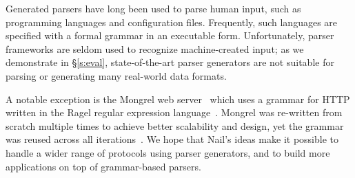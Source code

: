 Generated parsers have long been used to parse human input, such
as programming languages and configuration files. Frequently, such
languages are specified with a formal grammar in an executable
form. Unfortunately, parser frameworks are seldom used to recognize
machine-created input; as we demonstrate in \S\ref{s:eval},
state-of-the-art parser generators are not suitable for parsing or
generating many real-world data formats.

A notable exception is the Mongrel web server~\cite{mongrel} which
uses a grammar for HTTP written in the Ragel regular expression
language~\cite{ragel-paper}.  Mongrel was re-written from scratch
multiple times to achieve better scalability and design, yet the
grammar was reused across all iterations~\cite{patterson-citation}.
We hope that Nail's ideas make it possible to handle a wider range of
protocols using parser generators, and to build more applications on
top of grammar-based parsers.


